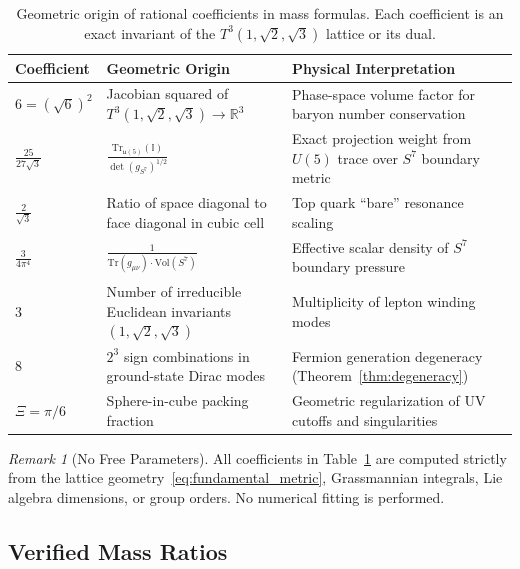 \documentclass[onecolumn,aps,prd,superscriptaddress,nofootinbib,amsmath,amssymb]{revtex4-2}
\theoremstyle{definition}
\theoremstyle{remark}
\newtheorem{remark}[theorem]{Remark}
\newcommand{\Tthree}{T^3(1,\sqrt{2},\sqrt{3})}
\begin{document}
\begin{table}[ht]
\caption{\label{tab:coeff_dict} Geometric origin of rational coefficients in mass formulas.
Each coefficient is an exact invariant of the $\Tthree$ lattice or its dual.}
\begin{tabular}{llp{8cm}}
\toprule
Coefficient & Geometric Origin & Physical Interpretation \\
\midrule
$6 = (\sqrt{6})^2$ & Jacobian squared of $\Tthree \to \mathbb{R}^3$ & Phase-space volume factor for baryon number conservation \\
$\frac{25}{27\sqrt{3}}$ & $\frac{\text{Tr}_{\mathfrak{u}(5)}(\mathbb{I})}{\det(g_{S^7})^{1/2}}$ & Exact projection weight from $U(5)$ trace over $S^7$ boundary metric \\
$\frac{2}{\sqrt{3}}$ & Ratio of space diagonal to face diagonal in cubic cell & Top quark ``bare'' resonance scaling \\
$\frac{3}{4\pi^4}$ & $\frac{1}{\text{Tr}(g_{\mu\nu}) \cdot \text{Vol}(S^7)}$ & Effective scalar density of $S^7$ boundary pressure \\
$3$ & Number of irreducible Euclidean invariants $(1,\sqrt{2},\sqrt{3})$ & Multiplicity of lepton winding modes \\
$8$ & $2^3$ sign combinations in ground-state Dirac modes & Fermion generation degeneracy (Theorem~\ref{thm:degeneracy}) \\
$\Xi = \pi/6$ & Sphere-in-cube packing fraction & Geometric regularization of UV cutoffs and singularities \\
\bottomrule
\end{tabular}
\end{table}

\begin{remark}[No Free Parameters]
All coefficients in Table~\ref{tab:coeff_dict} are computed strictly from the lattice geometry~\eqref{eq:fundamental_metric}, Grassmannian integrals, Lie algebra dimensions, or group orders. No numerical fitting is performed.
\end{remark}

\subsection{Verified Mass Ratios}
\end{document}
